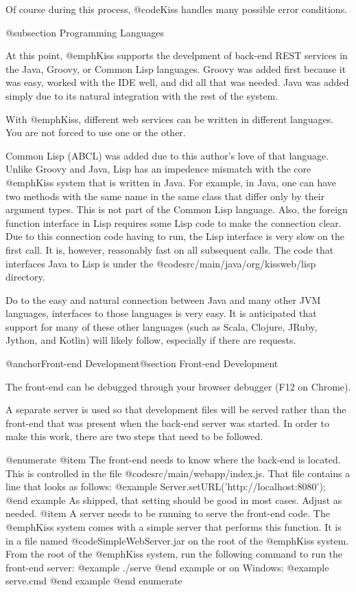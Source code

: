 Of course during this process, @code{Kiss} handles many possible error conditions.

@subsection Programming Languages

At this point, @emph{Kiss} supports the develpment of back-end REST
services in the Java, Groovy, or Common Lisp languages.  Groovy was
added first because it was easy, worked with the IDE well, and did all
that was needed.  Java was added simply due to its natural integration
with the rest of the system.

With @emph{Kiss}, different web services can be written in different
languages.  You are not forced to use one or the other.

Common Lisp (ABCL) was added due to this author's love of that
language.  Unlike Groovy and Java, Lisp has an impedence mismatch with
the core @emph{Kiss} system that is written in Java.  For example, in
Java, one can have two methods with the same name in the same class
that differ only by their argument types.  This is not part of the
Common Lisp language.  Also, the foreign function interface in Lisp
requires some Lisp code to make the connection clear.  Due to this
connection code having to run, the Lisp interface is very slow on the
first call.  It is, however, reasonably fast on all subsequent calls.
The code that interfaces Java to Lisp is under the
@code{src/main/java/org/kissweb/lisp} directory.

Do to the easy and natural connection between Java and many other JVM
languages, interfaces to those languages is very easy.  It is
anticipated that support for many of these other languages (such as
Scala, Clojure, JRuby, Jython, and Kotlin) will likely follow,
especially if there are requests.

@anchor{Front-end Development}@section Front-end Development

The front-end can be debugged through your browser debugger (F12 on Chrome).

A separate server is used so that development files will be served
rather than the front-end that was present when the back-end server
was started.  In order to make this work, there are two steps that
need to be followed.

@enumerate
@item
The front-end needs to know where the back-end is located.  This is controlled in the file @code{src/main/webapp/index.js}.
That file contains a line that looks as follows:
@example
    Server.setURL('http://localhost:8080');
@end example
As shipped, that setting should be good in most cases.  Adjust as needed.
@item
A server needs to be running to serve the front-end code.  The
@emph{Kiss} system comes with a simple server that performs this
function.  It is in a file named @code{SimpleWebServer.jar} on the
root of the @emph{Kiss} system.  From the root of the @emph{Kiss}
system, run the following command to run the front-end server:
@example
   ./serve
@end example
or on Windows:
@example
   serve.cmd
@end example
@end enumerate

